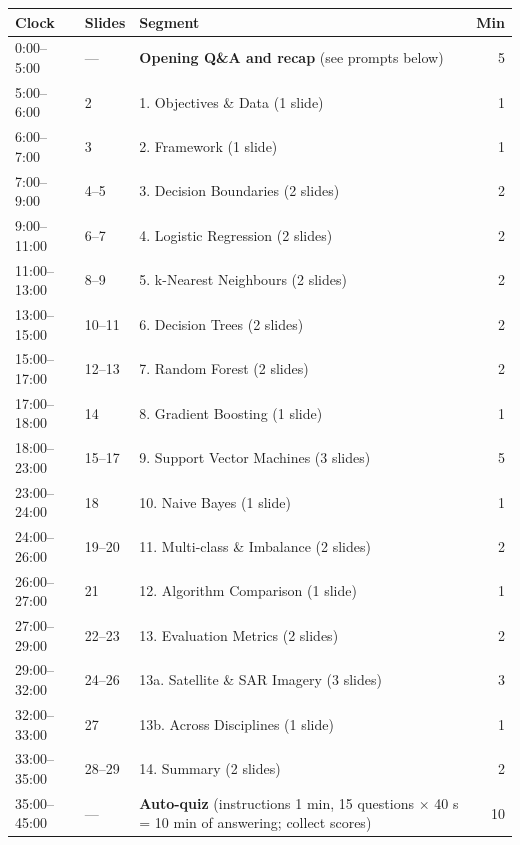 \documentclass[11pt]{article}
\begin{document}
\begin{center}\small\renewcommand{\arraystretch}{1.2}\begin{tabularx}{\textwidth}{@{}l l X r@{}}\toprule\textbf{Clock} & \textbf{Slides} & \textbf{Segment} & \textbf{Min}\\\midrule

0:00--5:00 & --- & \textbf{Opening Q\&A and recap} (see prompts below) & 5\\

5:00--6:00 & 2 & 1. Objectives \& Data (1 slide) & 1\\

6:00--7:00 & 3 & 2. Framework (1 slide) & 1\\

7:00--9:00 & 4--5 & 3. Decision Boundaries (2 slides) & 2\\

9:00--11:00 & 6--7 & 4. Logistic Regression (2 slides) & 2\\

11:00--13:00 & 8--9 & 5. k-Nearest Neighbours (2 slides) & 2\\

13:00--15:00 & 10--11 & 6. Decision Trees (2 slides) & 2\\

15:00--17:00 & 12--13 & 7. Random Forest (2 slides) & 2\\

17:00--18:00 & 14 & 8. Gradient Boosting (1 slide) & 1\\

18:00--23:00 & 15--17 & 9. Support Vector Machines (3 slides) & 5\\

23:00--24:00 & 18 & 10. Naive Bayes (1 slide) & 1\\

24:00--26:00 & 19--20 & 11. Multi-class \& Imbalance (2 slides) & 2\\

26:00--27:00 & 21 & 12. Algorithm Comparison (1 slide) & 1\\

27:00--29:00 & 22--23 & 13. Evaluation Metrics (2 slides) & 2\\

29:00--32:00 & 24--26 & 13a. Satellite \& SAR Imagery (3 slides) & 3\\

32:00--33:00 & 27 & 13b. Across Disciplines (1 slide) & 1\\

33:00--35:00 & 28--29 & 14. Summary (2 slides) & 2\\

35:00--45:00 & --- & \textbf{Auto-quiz} (instructions 1 min, 15 questions $\times$ 40 s = 10 min of answering; collect scores) & 10\\\bottomrule\end{tabularx}\end{center}
\end{document}
